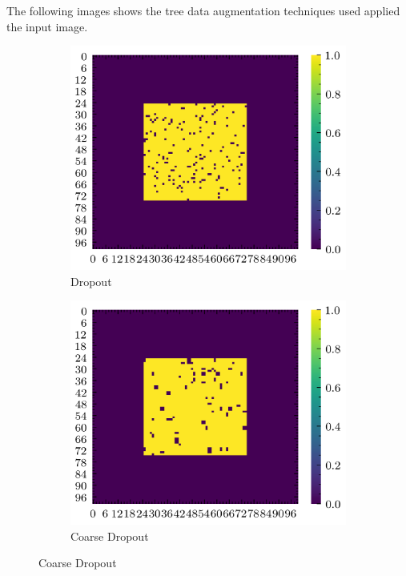 \documentclass[../document.tex]{subfiles}
\begin{document}
The following images shows the tree data augmentation techniques used applied the input image.
\begin{figure}[H]
    \centering
        \begin{subfigure}[b]{0.45\textwidth}
            \includegraphics[width=\textwidth]{../img/data-aug/2d/center-dropout.png}
            \caption{Dropout}
        \end{subfigure}
        \begin{subfigure}[b]{0.45\linewidth}
            \includegraphics[width=\textwidth]{../img/data-aug/2d/center-coarse-dropout.png}
            \caption{Coarse Dropout}
            \end{subfigure}    


\end{figure}
\end{document}
